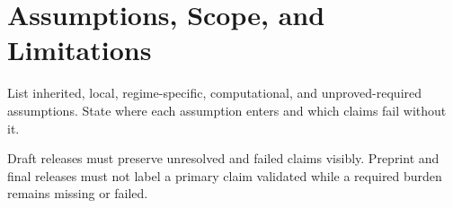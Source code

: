 \section{Assumptions, Scope, and Limitations}

List inherited, local, regime-specific, computational, and unproved-required assumptions. State where each assumption enters and which claims fail without it.

Draft releases must preserve unresolved and failed claims visibly. Preprint and final releases must not label a primary claim validated while a required burden remains missing or failed.
